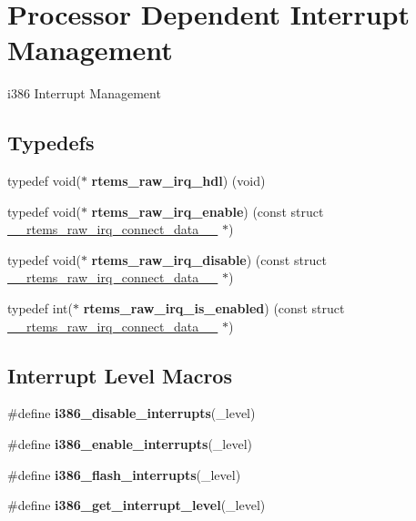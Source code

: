 \hypertarget{group__RTEMSScoreCPUi386Interrupt}{}\section{Processor Dependent Interrupt Management}
\label{group__RTEMSScoreCPUi386Interrupt}


i386 Interrupt Management  


\subsection*{Typedefs}
\begin{DoxyCompactItemize}
\item 
\mbox{\label{group__RTEMSScoreCPUi386Interrupt_gaeb23ad0e3f403fff94bc90da50361efd}} 
typedef void($\ast$ {\bfseries rtems\+\_\+raw\+\_\+irq\+\_\+hdl}) (void)
\item 
\mbox{\label{group__RTEMSScoreCPUi386Interrupt_ga4cd67daf978658cc4cffbaf584fb34ba}} 
typedef void($\ast$ {\bfseries rtems\+\_\+raw\+\_\+irq\+\_\+enable}) (const struct \mbox{\hyperlink{struct____rtems__raw__irq__connect__data____}{\+\_\+\+\_\+rtems\+\_\+raw\+\_\+irq\+\_\+connect\+\_\+data\+\_\+\+\_\+}} $\ast$)
\item 
\mbox{\label{group__RTEMSScoreCPUi386Interrupt_gaa4fb5296caed154778c241189abb725d}} 
typedef void($\ast$ {\bfseries rtems\+\_\+raw\+\_\+irq\+\_\+disable}) (const struct \mbox{\hyperlink{struct____rtems__raw__irq__connect__data____}{\+\_\+\+\_\+rtems\+\_\+raw\+\_\+irq\+\_\+connect\+\_\+data\+\_\+\+\_\+}} $\ast$)
\item 
\mbox{\label{group__RTEMSScoreCPUi386Interrupt_gad08ff3964fea26be84f43fd1911bbef6}} 
typedef int($\ast$ {\bfseries rtems\+\_\+raw\+\_\+irq\+\_\+is\+\_\+enabled}) (const struct \mbox{\hyperlink{struct____rtems__raw__irq__connect__data____}{\+\_\+\+\_\+rtems\+\_\+raw\+\_\+irq\+\_\+connect\+\_\+data\+\_\+\+\_\+}} $\ast$)
\end{DoxyCompactItemize}
\subsection*{Interrupt Level Macros}
\begin{DoxyCompactItemize}
\item 
\#define {\bfseries i386\+\_\+disable\+\_\+interrupts}(\+\_\+level)
\item 
\#define {\bfseries i386\+\_\+enable\+\_\+interrupts}(\+\_\+level)
\item 
\#define {\bfseries i386\+\_\+flash\+\_\+interrupts}(\+\_\+level)
\item 
\#define {\bfseries i386\+\_\+get\+\_\+interrupt\+\_\+level}(\+\_\+level)
\end{DoxyCompactItemize}


